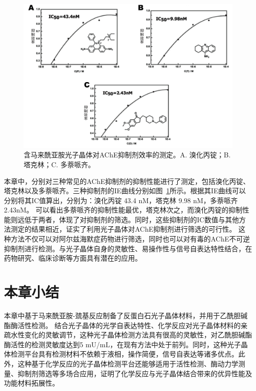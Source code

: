 \begin{figure}[htbp]
  \centering
  \includegraphics[width=\linewidth]{figures/ch3/inhibitor.png}
  \caption{含马来酰亚胺光子晶体对AChE抑制剂效率的测定。A. 溴化丙锭；B. 塔克林；C. 多萘哌齐。}
  \label{fig:maleimide-inhibitor}
\end{figure}

本章中，分别对三种常见的AChE抑制剂的抑制性能进行了测定，包括溴化丙锭、塔克林以及多萘哌齐。三种抑制剂的IE曲线分别如图~\ref{fig:maleimide-inhibitor}所示。根据其IE曲线可以分别将其IC值算出，分别为：溴化丙锭 43.4 nM，塔克林 9.98 nM，多萘哌齐 2.43nM。
可以看出多萘哌齐的抑制性能最优，塔克林次之，而溴化丙锭的抑制性能则远低于两者，体现了对抑制剂的筛选。同时，这些抑制剂的IC数值与其他方法测定的结果相近，证实了利用光子晶体对AChE抑制剂进行筛选的可行性。
这种方法不仅可以对阿尔兹海默症药物进行筛选，同时也可以对有毒的AChE不可逆抑制剂进行检测。与光子晶体自身的灵敏性、易操作性与信号自表达特性结合，在药物研究、临床诊断等方面具有潜在的应用。

\section{本章小结}

本章中基于马来酰亚胺-巯基反应制备了反蛋白石光子晶体材料，并用于乙酰胆碱酯酶活性检测。
结合光子晶体的光学自表达特性、化学反应对光子晶体材料的亲疏水性变化的灵敏调节，这种光子晶体检测方法具有很高的灵敏性，对乙酰胆碱酯酶活性的检测灵敏度达到5 mU/mL，在现有方法中处于前列。同时，这种光子晶体检测平台具有检测材料不依赖于液相，操作简便，信号自表达等诸多优点。此外，这种基于化学反应的光子晶体检测平台还能够适用于活性检测、酶动力学测量、抑制剂筛选等多场合应用，证明了化学反应与光子晶体结合带来的优异性能及功能材料拓展性。